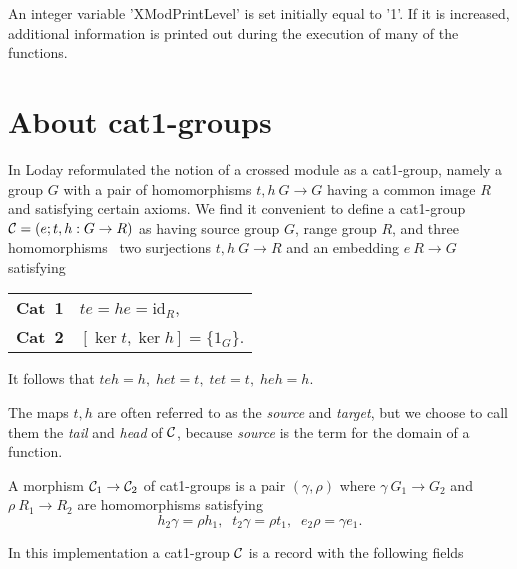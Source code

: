 An integer variable 'XModPrintLevel' is set initially equal to '1'.
If it is increased, additional information is printed out during
the execution of many of the functions.

\newpage



\section{About cat1-groups}%

In \cite{L1} Loday reformulated the notion of a 
crossed module as a cat1-group, 
namely a group $G$ with a pair of homomorphisms $t,h \: G \to G$
having  a common image $R$ and satisfying certain axioms.
We find it convenient to define a cat1-group 
${\cal C} = (e;t,h \: G \to R )$  as having source group  $G$,
range group $R$,  and three homomorphisms\: \  two surjections  
$t,h \: G \to R$  and an embedding  $e \: R \to G$  satisfying\:
\begin{center}
\begin{tabular}{r l}
\textbf{Cat\ 1\:}  &  $te = he = \mathrm{id}_R $, \\
\textbf{Cat\ 2\:}  &  $[\ker t, \ker h] = \{ 1_G \}$.
\end{tabular}
\end{center}
It follows that  $teh = h, \; het = t, \; tet = t, \; heh = h$.


The maps  $t,h$  are often referred to as the {\em source} and {\em target},
but we choose to call them the
{\em tail} and {\em head} of  ${\cal C}$, 
because {\em source} is the {\GAP} term for the domain of a function.

A morphism  ${\cal C}_1 \to {\cal C}_2$  
of cat1-groups is a pair  $(\gamma, \rho)$  where
$\gamma \: G_1 \to G_2$  and  $\rho \: R_1 \to R_2$  
are homomorphisms satisfying
$$
h_2 \gamma = \rho h_1, \;\; t_2 \gamma = \rho t_1, \;\; e_2 \rho = \gamma e_1.
$$


In this implementation a cat1-group $ {\cal C}$ 
is a record with the following fields\:


